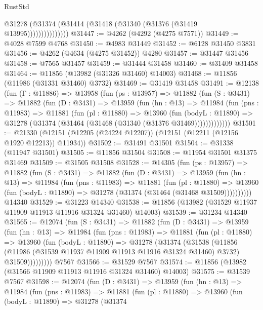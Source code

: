 \begin{lexlean}{RustStd}
\begin{coremodule}
                    @31278 (@31374 (@31414 (@31418 (@31340 (@31376 (@31419 @13995)))))))))))))))
@31447 := @4262 (@4292 (@4275 @7571))
@31449 := @4028 @7599 @4768
@31450 := @4983 @31449
@31452 := @6128 @31450 @3831
@31456 := @4262 (@4634 (@4275 @31452)) @4280
@31457 := @31447 @31456
@31458 := @7565 @31457
@31459 := @31444 @31458
@31460 := @31409 @31458
@31464 := @11856 (@13982 (@31326 @31460) @14003)
@31468 := @11856 (@11986 (@31331 @31460) @3732)
@31469 := @31419 @31458
@31491 := @12138
    (fun (Γ : @11886) =>
    @13958
      (fun (ps : @13957) =>
      @11882
        (fun (S : @3431) =>
        @11882
          (fun (D : @3431) =>
          @13959
            (fun (hn : @13) =>
            @11984
              (fun (pns : @11983) =>
              @11881
                (fun (pl : @11880) =>
                @13960
                  (fun (bodyL : @11890) =>
                  @31278 (@31374 (@31464 (@31468 (@31340 (@31376 @31469)))))))))))))
@31501 := @21330 (@12151 (@12205 (@24224 @12207)) (@12151 (@12211 (@12156 @1920 @12213)) @11934))
@31502 := @31491 @31501
@31504 := @31338 (@11947 @31501)
@31505 := @11856 @31504
@31508 := @11954 @31501 @31375 @31469
@31509 := @31505 @31508
@31528 := @14305
    (fun (ps : @13957) =>
    @11882
      (fun (S : @3431) =>
      @11882
        (fun (D : @3431) =>
        @13959
          (fun (hn : @13) =>
          @11984
            (fun (pns : @11983) =>
            @11881
              (fun (pl : @11880) =>
              @13960 (fun (bodyL : @11890) => @31278 (@31374 (@31464 (@31468 @31509))))))))))
    @14340
@31529 := @31223 @14340
@31538 := @11856 (@13982 (@31529 @11937 @11909 @11913 @11916 @31324 @31460) @14003)
@31539 := @31234 @14340
@31565 := @12074
    (fun (S : @3431) =>
    @11882
      (fun (D : @3431) =>
      @13959
        (fun (hn : @13) =>
        @11984
          (fun (pns : @11983) =>
          @11881
            (fun (pl : @11880) =>
            @13960
              (fun (bodyL : @11890) =>
              @31278
                (@31374
                  (@31538
                    (@11856
                      (@11986 (@31539 @11937 @11909 @11913 @11916 @31324 @31460) @3732)
                      @31509)))))))))
    @7567
@31566 := @31529 @7567
@31574 := @11856 (@13982 (@31566 @11909 @11913 @11916 @31324 @31460) @14003)
@31575 := @31539 @7567
@31598 := @12074
    (fun (D : @3431) =>
    @13959
      (fun (hn : @13) =>
      @11984
        (fun (pns : @11983) =>
        @11881
          (fun (pl : @11880) =>
          @13960
            (fun (bodyL : @11890) =>
            @31278
              (@31374

\end{coremodule}
\end{lexlean}
